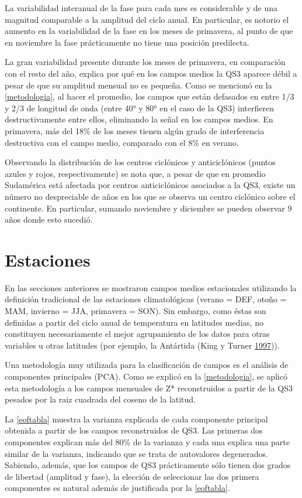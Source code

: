 \documentclass[spanish,a4paper,12p]{book}
\begin{document}
La variabilidad interanual de la fase para cada mes es considerable y de
una magnitud comparable a la amplitud del ciclo anual. En particular, es
notorio el aumento en la variabilidad de la fase en los meses de
primavera, al punto de que en noviembre la fase prácticamente no tiene
una posición predilecta.

La gran variabilidad presente durante los meses de primavera, en
comparación con el resto del año, explica por qué en los campos medios
la QS3 aparece débil a pesar de que su amplitud mensual no es pequeña.
Como se mencionó en la \autoref{metodologia}, al hacer el promedio, los
campos que están defasados en entre 1/3 y 2/3 de longitud de onda (entre
40° y 80° en el caso de la QS3) interfieren destructivamente entre
ellos, eliminando la señal en los campos medios. En primavera, más del
18\% de los meses tienen algún grado de interferencia destructiva con el
campo medio, comparado con el 8\% en verano.

Observando la distribución de los centros ciclónicos y anticiclónicos
(puntos azules y rojos, respectivamente) se nota que, a pesar de que en
promedio Sudamérica está afectada por centros anticiclónicos asociados a
la QS3, existe un número no despreciable de años en los que se observa
un centro ciclónico sobre el continente. En particular, sumando
noviembre y diciembre se pueden observar 9 años donde esto sucedió.

\section{Estaciones}\label{estaciones}

En las secciones anteriores se mostraron campos medios estacionales
utilizando la definición tradicional de las estaciones climatológicas
(verano = DEF, otoño = MAM, invierno = JJA, primavera = SON). Sin
embargo, como éstas son definidas a partir del ciclo anual de
temperatura en latitudes medias, no constituyen necesariamente el mejor
agrupamiento de los datos para otras variables u otras latitudes (por
ejemplo, la Antártida (King y Turner
\protect\hyperlink{ref-King1997}{1997})).

Una metodología muy utilizada para la clasificación de campos es el
análisis de componentes principales (PCA). Como se explicó en la
\autoref{metodologia}, se aplicó esta metodología a los campos mensuales
de Z* reconstruidos a partir de la QS3 pesados por la raiz cuadrada del
coseno de la latitud.

La \autoref{eoftabla} muestra la varianza explicada de cada componente
principal obtenida a partir de los campos reconstruidos de QS3. Las
primeras dos componentes explican más del 80\% de la varianza y cada una
explica una parte similar de la varianza, indicando que se trata de
autovalores degenerados. Sabiendo, además, que los campos de QS3
prácticamente sólo tienen dos grados de libertad (amplitud y fase), la
elección de seleccionar las dos primera componentes es natural además de
justificada por la \autoref{eoftabla}.
\end{document}
